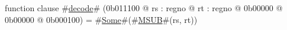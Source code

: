 function clause #\hyperref[zdecode]{decode}# (0b011100 @ rs : regno @ rt : regno @ 0b00000 @ 0b00000 @ 0b000100) =
  #\hyperref[zSome]{Some}#(#\hyperref[zMSUB]{MSUB}#(rs, rt))
